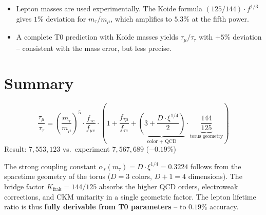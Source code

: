 	\begin{itemize}
		\item Lepton masses are used experimentally. The Koide formula $(125/144) \cdot f^{1/3}$ gives $1\%$ deviation for $m_\tau/m_\mu$, which amplifies to $5.3\%$ at the fifth power.
		\item A complete T0 prediction with Koide masses yields $\tau_\mu/\tau_\tau$ with $+5\%$ deviation -- consistent with the mass error, but less precise.
	\end{itemize}
	
	
	\section{Summary}
	
	\begin{keypoint}
		\begin{equation}
			\frac{\tau_\mu}{\tau_\tau} = \left(\frac{m_\tau}{m_\mu}\right)^5 \cdot \frac{f_{\tau e}}{f_{\mu e}} \cdot \left(1 + \frac{f_{\tau\mu}}{f_{\tau e}} + \underbrace{\left(3 + \frac{D \cdot \xi^{1/4}}{2}\right)}_{\text{color + QCD}} \cdot \underbrace{\frac{144}{125}}_{\text{torus geometry}}\right)
		\end{equation}
		Result: $7{,}553{,}123$ vs.\ experiment $7{,}567{,}689$ (\textbf{$-0.19\%$})
	\end{keypoint}
	
	The strong coupling constant $\alpha_s(m_\tau) = D \cdot \xi^{1/4} = 0.3224$ follows from the spacetime geometry of the torus ($D = 3$ colors, $D+1 = 4$ dimensions). The bridge factor $K_\text{frak} = 144/125$ absorbs the higher QCD orders, electroweak corrections, and CKM unitarity in a single geometric factor. The lepton lifetime ratio is thus \textbf{fully derivable from T0 parameters} -- to $0.19\%$ accuracy.
